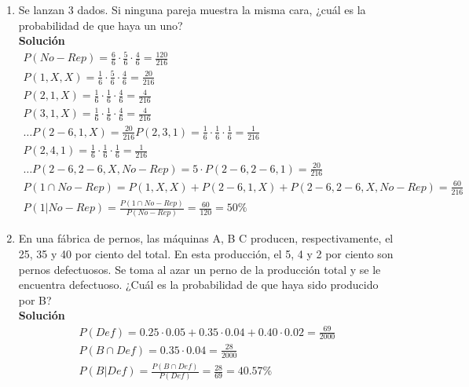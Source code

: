 \begin{enumerate}
	\item Se lanzan 3 dados. Si  ninguna pareja muestra la misma cara, ¿cuál es la probabilidad de que haya un uno?
	\\\textbf{Solución}
	\begin{gather*}
        P(No-Rep) = \frac{6}{6} \cdot \frac{5}{6} \cdot \frac{4}{6} = \frac{120}{216} \\
        P(1,X,X) = \frac{1}{6} \cdot \frac{5}{6} \cdot \frac{4}{6} = \frac{20}{216} \\
        P(2,1,X) = \frac{1}{6} \cdot \frac{1}{6} \cdot \frac{4}{6} = \frac{4}{216} \\
        P(3,1,X) = \frac{1}{6} \cdot \frac{1}{6} \cdot \frac{4}{6} = \frac{4}{216} \\
        \ldots P(2-6,1,X) = \frac{20}{216}
        P(2,3,1) = \frac{1}{6} \cdot \frac{1}{6} \cdot \frac{1}{6} = \frac{1}{216} \\
        P(2,4,1) = \frac{1}{6} \cdot \frac{1}{6} \cdot \frac{1}{6} = \frac{1}{216} \\
        \ldots P(2-6,2-6,X,No-Rep) = 5 \cdot P(2-6,2-6,1) = \frac{20}{216} \\
        P(1 \cap No-Rep) = P(1,X,X) + P(2-6,1,X) + P(2-6,2-6,X,No-Rep) = \frac{60}{216} \\
        P(1 | No-Rep) = \frac{P(1 \cap No-Rep)}{P(No-Rep)} = \frac{60}{120} = 50\%
	\end{gather*}

    \item En una fábrica de pernos, las máquinas A, B C producen, respectivamente, el 25, 35 y 40 por ciento del total. En esta producción, el 5, 4 y 2 por ciento son pernos defectuosos. Se toma al azar un perno de la producción total y se le encuentra defectuoso. ¿Cuál es la probabilidad de que haya sido producido por B?
	\\\textbf{Solución}
	\begin{gather*}
        P(Def) = 0.25 \cdot 0.05 + 0.35 \cdot 0.04 + 0.40 \cdot 0.02 = \frac{69}{2000} \\
        P(B \cap Def) = 0.35 \cdot 0.04 = \frac{28}{2000} \\
        P(B | Def) = \frac{P(B \cap Def)}{P(Def)} = \frac{28}{69} = 40.57\%
	\end{gather*}


\end{enumerate}
